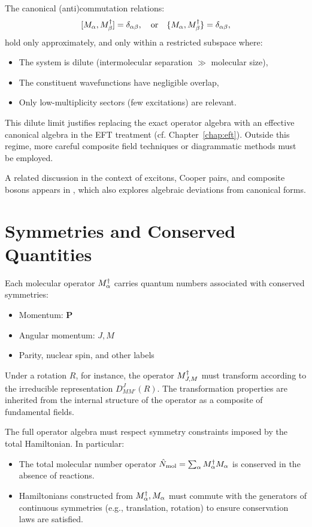 The canonical (anti)commutation relations:
\[
[M_{\alpha}, M^\dagger_{\beta}] = \delta_{\alpha\beta}, \quad \text{or} \quad \{M_{\alpha}, M^\dagger_{\beta}\} = \delta_{\alpha\beta},
\]
hold only approximately, and only within a restricted subspace where:
\begin{itemize}
  \item The system is dilute (intermolecular separation \(\gg\) molecular size),
  \item The constituent wavefunctions have negligible overlap,
  \item Only low-multiplicity sectors (few excitations) are relevant.
\end{itemize}

This dilute limit justifies replacing the exact operator algebra with an effective canonical algebra in the EFT treatment (cf. Chapter~\ref{chap:eft}). Outside this regime, more careful composite field techniques or diagrammatic methods must be employed.

A related discussion in the context of excitons, Cooper pairs, and composite bosons appears in \cite{Combescot2008}, which also explores algebraic deviations from canonical forms.

\section{Symmetries and Conserved Quantities}
\label{sec:algebra_symmetries}

Each molecular operator \(M^\dagger_{\alpha}\) carries quantum numbers associated with conserved symmetries:
\begin{itemize}
	\item Momentum: \(\mathbf{P}\)
	\item Angular momentum: \(J, M\)
	\item Parity, nuclear spin, and other labels
\end{itemize}

Under a rotation \(R\), for instance, the operator \(M^\dagger_{J,M}\) must transform according to the irreducible representation \(D^J_{MM'}(R)\). The transformation properties are inherited from the internal structure of the operator as a composite of fundamental fields.

The full operator algebra must respect symmetry constraints imposed by the total Hamiltonian. In particular:
\begin{itemize}
	\item The total molecular number operator \(\hat{N}_{\text{mol}} = \sum_\alpha M^\dagger_{\alpha} M_{\alpha}\) is conserved in the absence of reactions.
	\item Hamiltonians constructed from \(M^\dagger_{\alpha}, M_{\alpha}\) must commute with the generators of continuous symmetries (e.g., translation, rotation) to ensure conservation laws are satisfied.
\end{itemize}

